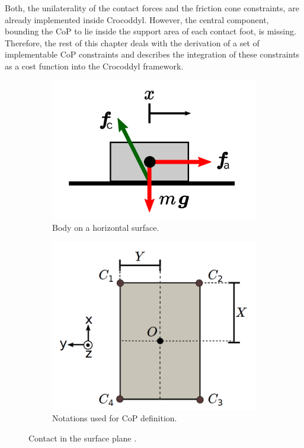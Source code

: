 Both, the unilaterality of the contact forces and the friction cone constraints, are already implemented inside Crocoddyl. However, the central component, bounding the \gls{CoP} to lie inside the support area of each contact foot, is missing. Therefore, the rest of this chapter deals with the derivation of a set of implementable \gls{CoP} constraints and describes the integration of these constraints as a cost function into the Crocoddyl framework.
\begin{figure}[t]
	\begin{subfigure}{.5\textwidth}
		\centering
		\includegraphics[width=.95\linewidth]{img/simple_contact}
		\caption{Body on a horizontal surface.}
		\label{img:simple_contact}
	\end{subfigure}%
	\begin{subfigure}{.5\textwidth}
		\centering
		\includegraphics[width=.77\linewidth]{img/contact_surface}
		\caption{Notations used for \gls{CoP} definition.}
		\label{img:contact_surface}
	\end{subfigure}
	\caption[Contact in the surface plane.]{Contact in the surface plane \cite{caron2015stability}.}
	\label{fig:natural2robot}
\end{figure}


